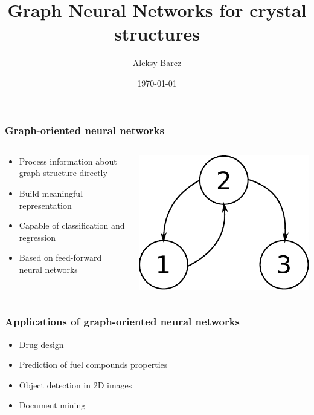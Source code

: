 \documentclass{beamer}
\author{Aleksy Barcz}
\title{Graph Neural Networks for crystal structures}
\date{\today}
\institute{Warsaw University of Technology}
\begin{document}
\frame{\titlepage}

\begin{frame}
\frametitle{Graph-oriented neural networks}
\begin{columns}
	\begin{column}{0.66\textwidth}
		\begin{itemize}
			\item Process information about graph structure directly
			\item Build meaningful representation
			\item Capable of classification and regression
			\item Based on feed-forward neural networks
		\end{itemize}
	\end{column}
	\begin{column}{0.34\textwidth}
		\includegraphics[scale=0.4]{img/graph}
	\end{column}
\end{columns}
\end{frame}

\begin{frame}
\frametitle{Applications of graph-oriented neural networks}
\begin{itemize}
	\item Drug design
	\item Prediction of fuel compounds properties
	\item Object detection in 2D images
	\item Document mining
\end{itemize}
\end{frame}
\end{document}
